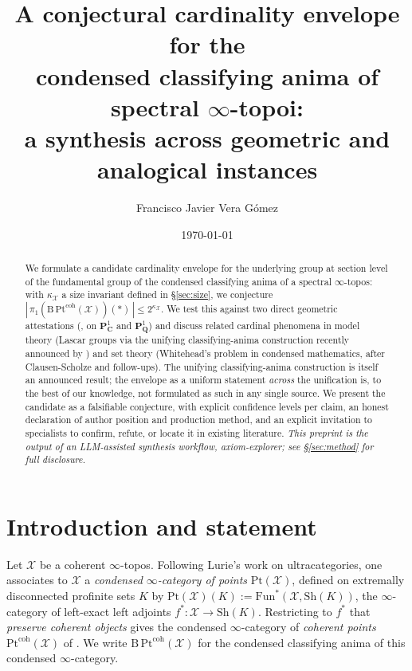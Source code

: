 \documentclass[11pt]{article}
\title{A conjectural cardinality envelope for the\\
  condensed classifying anima of spectral $\infty$-topoi:\\
  a synthesis across geometric and analogical instances}
\author[1]{Francisco Javier Vera G\'omez}
\affil[1]{Independent researcher\\
\href{https://orcid.org/0009-0001-3516-5871}{ORCID: 0009-0001-3516-5871}\\
Repository:
\href{https://github.com/Dredok/axiom-explorer}{github.com/Dredok/axiom-explorer}\\
Version: v1.2.2-preprint\\
DOI: \href{https://doi.org/10.5281/zenodo.20184660}{10.5281/zenodo.20184660}}
\date{\today}
\theoremstyle{definition}
\theoremstyle{plain}
\theoremstyle{remark}
\newcommand{\Pt}{\mathrm{Pt}}
\newcommand{\Bcat}{\mathrm{B}}
\newcommand{\Sh}{\mathrm{Sh}}
\newcommand{\Pone}{\mathbf{P}^{1}}
\newcommand{\C}{\mathbf{C}}
\newcommand{\Q}{\mathbf{Q}}
\begin{document}
\maketitle

\begin{abstract}
We formulate a candidate cardinality envelope for the underlying group at section
level of the fundamental group of the condensed classifying anima of a spectral
$\infty$-topos: with $\kappa_{\mathcal X}$ a size invariant defined in
\S\ref{sec:size}, we conjecture
$|\,\pi_1(\Bcat\,\Pt^{\mathrm{coh}}(\mathcal X))(\ast)\,| \le 2^{\kappa_{\mathcal X}}$.
We test this against two direct geometric attestations (\cite{HHLMMW2025}, on
$\Pone_{\C}$ and $\Pone_{\Q}$) and discuss related cardinal phenomena in
model theory (Lascar groups via the unifying classifying-anima construction
recently announced by \cite{Haine2026classifying}) and set theory (Whitehead's
problem in condensed mathematics, after Clausen-Scholze and follow-ups).
The unifying classifying-anima construction is itself an announced result; the
envelope as a uniform statement \emph{across} the unification is, to the best
of our knowledge, not formulated as such in any single source. We present the
candidate as a falsifiable conjecture, with explicit confidence levels per
claim, an honest declaration of author position and production method, and an
explicit invitation to specialists to confirm, refute, or locate it in
existing literature. \emph{This preprint is the output of an LLM-assisted
synthesis workflow, axiom-explorer; see \S\ref{sec:method} for full
disclosure.}
\end{abstract}

\section{Introduction and statement}\label{sec:intro}

Let $\mathcal{X}$ be a coherent $\infty$-topos. Following Lurie's work on
ultracategories, one associates to $\mathcal{X}$ a \emph{condensed
$\infty$-category of points} $\Pt(\mathcal{X})$, defined on extremally
disconnected profinite sets $K$ by
$\Pt(\mathcal{X})(K) := \mathrm{Fun}^{\ast}(\mathcal{X}, \Sh(K))$, the
$\infty$-category of left-exact left adjoints
$f^{\ast}: \mathcal{X} \to \Sh(K)$. Restricting to $f^{\ast}$ that
\emph{preserve coherent objects} gives the condensed $\infty$-category of
\emph{coherent points} $\Pt^{\mathrm{coh}}(\mathcal{X})$ of
\cite{BarwickGlasmanHaine2018}. We write
$\Bcat\,\Pt^{\mathrm{coh}}(\mathcal{X})$ for the condensed classifying anima of
this condensed $\infty$-category.
\end{document}
